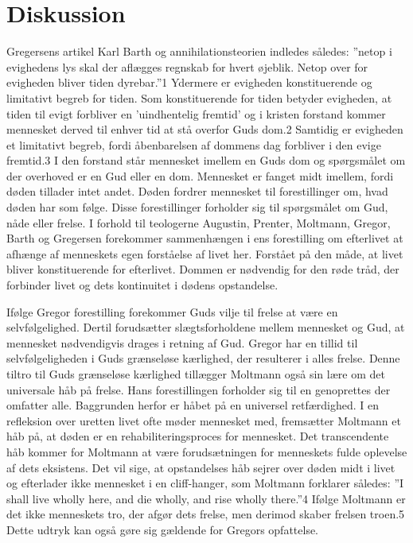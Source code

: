 \chapter{Diskussion}
Gregersens artikel Karl Barth og annihilationsteorien indledes således: ”netop i evighedens lys skal der aflægges regnskab for hvert øjeblik. Netop over for evigheden bliver tiden dyrebar.”1 Ydermere er evigheden konstituerende og limitativt begreb for tiden. Som konstituerende for tiden betyder evigheden, at tiden til evigt forbliver en ’uindhentelig fremtid’ og i kristen forstand kommer mennesket derved til enhver tid at stå overfor Guds dom.2 Samtidig er evigheden et limitativt begreb, fordi åbenbarelsen af dommens dag forbliver i den evige fremtid.3 I den forstand står mennesket imellem en Guds dom og spørgsmålet om der overhoved er en Gud eller en dom. Mennesket er fanget midt imellem, fordi døden tillader intet andet. Døden fordrer mennesket til forestillinger om, hvad døden har som følge. Disse forestillinger forholder sig til spørgsmålet om Gud, nåde eller frelse. I forhold til teologerne Augustin, Prenter, Moltmann, Gregor, Barth og Gregersen forekommer sammenhængen i ens forestilling om efterlivet at afhænge af menneskets egen forståelse af livet her. Forstået på den måde, at livet bliver konstituerende for efterlivet. Dommen er nødvendig for den røde tråd, der forbinder livet og dets kontinuitet i dødens opstandelse.

Ifølge Gregor forestilling forekommer Guds vilje til frelse at være en selvfølgelighed. Dertil forudsætter slægtsforholdene mellem mennesket og Gud, at mennesket nødvendigvis drages i retning af Gud. Gregor har en tillid til selvfølgeligheden i Guds grænseløse kærlighed, der resulterer i alles frelse. Denne tiltro til Guds grænseløse kærlighed tillægger Moltmann også sin lære om det universale håb på frelse. Hans forestillingen forholder sig til en genoprettes der omfatter alle. Baggrunden herfor er håbet på en universel retfærdighed. I en refleksion over uretten livet ofte møder mennesket med, fremsætter Moltmann et håb på, at døden er en rehabiliteringsproces for mennesket. Det transcendente håb kommer for Moltmann at være forudsætningen for menneskets fulde oplevelse af dets eksistens. Det vil sige, at opstandelses håb sejrer over døden midt i livet og efterlader ikke mennesket i en cliff-hanger, som Moltmann forklarer således: ”I shall live wholly here, and die wholly, and rise wholly there.”4 Ifølge Moltmann er det ikke menneskets tro, der afgør dets frelse, men derimod skaber frelsen troen.5 Dette udtryk kan også gøre sig gældende for Gregors opfattelse.

